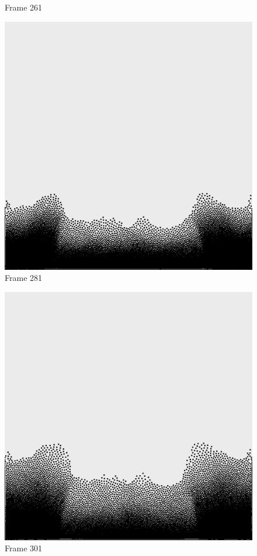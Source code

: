 \documentclass[a4paper, 12pt, oneside]{book}
\begin{document}
\begin{figure}[!ht]
\begin{center}
            Frame 261
        \end{center}
    \endminipage
    \hfill
        \begin{center}
            \includegraphics[width=\linewidth]{images/test_case_1/281.png}
            Frame 281
        \end{center}
    \endminipage
    \hfill
        \begin{center}
            \includegraphics[width=\linewidth]{images/test_case_1/301.png}
            Frame 301
        \end{center}
    \endminipage
    \hfill


\end{figure}
\end{document}
